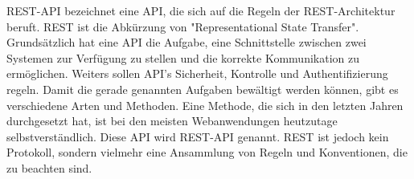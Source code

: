 
REST-API bezeichnet eine API, die sich auf die Regeln der REST-Architektur beruft. REST ist die Abkürzung von "Representational State Transfer". Grundsätzlich hat eine API die Aufgabe, eine Schnittstelle zwischen zwei Systemen zur Verfügung zu stellen und die korrekte Kommunikation zu ermöglichen. Weiters sollen API's Sicherheit, Kontrolle und Authentifizierung regeln. Damit die gerade genannten Aufgaben bewältigt werden können, gibt es verschiedene Arten und Methoden. Eine Methode, die sich in den letzten Jahren durchgesetzt hat, ist bei den meisten Webanwendungen heutzutage selbstverständlich. Diese API wird REST-API genannt. REST ist jedoch kein Protokoll, sondern vielmehr eine Ansammlung von Regeln und Konventionen, die zu beachten sind. \cite{WikiREST}

